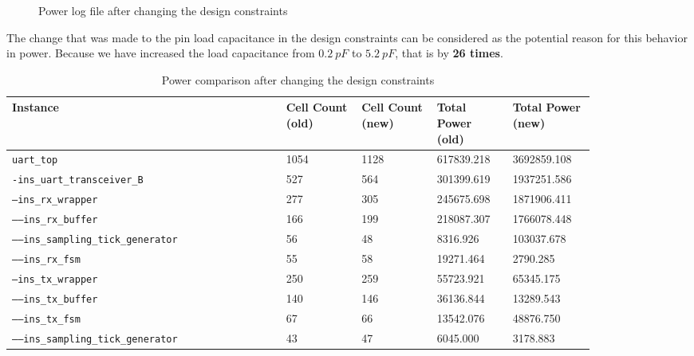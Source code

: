 \documentclass[a4paper,11pt]{article}%
\begin{document}
\begin{figure}[h]
	\centering
	\caption{Power log file after changing the design constraints}
	\label{fig:power_log3}
\end{figure}

The change that was made to the pin load capacitance in the design constraints can be considered as the potential reason for this behavior in power. Because we have increased the load capacitance from $0.2~pF$ to $5.2~pF$, that is by \textbf{26 times}.

\begin{table}[h]
	\centering
	\caption{Power comparison after changing the design constraints}
	\begin{tabular}{|L{0.4\linewidth}  |C{0.11\linewidth}  | C{0.11\linewidth}  |C{0.11\linewidth}  | C{0.12\linewidth} |} \hline
		Instance & Cell Count (old)  & Cell Count (new) & Total Power (old) & Total Power (new) \\ \hline
		{\tt uart\_top} 							 & 1054 & 1128 &  617839.218 & 3692859.108 \\ \hline
		{\tt -ins\_uart\_transceiver\_B} 			 &  527 &  564 &  301399.619 & 1937251.586 \\ \hline
		{\tt ---ins\_rx\_wrapper} 					 &  277 &  305 &  245675.698 & 1871906.411 \\ \hline
		{\tt -----ins\_rx\_buffer} 					 &  166 &  199 &  218087.307 & 1766078.448 \\ \hline
		{\tt -----ins\_sampling\_tick\_generator} 	 &   56 &   48 &    8316.926 &  103037.678 \\ \hline
		{\tt -----ins\_rx\_fsm} 					 &   55 &   58 &   19271.464 &    2790.285 \\ \hline
		{\tt ---ins\_tx\_wrapper} 					 &  250 &  259 &   55723.921 &   65345.175 \\ \hline
		{\tt -----ins\_tx\_buffer} 					 &  140 &  146 &   36136.844 &   13289.543 \\ \hline
		{\tt -----ins\_tx\_fsm} 					 &   67 &   66 &   13542.076 &   48876.750 \\ \hline
		{\tt -----ins\_sampling\_tick\_generator} 	 &   43 &   47 &    6045.000 &    3178.883 \\ \hline	
	\end{tabular}
	\label{table:power_after_const_change}
\end{table}
\end{document}
